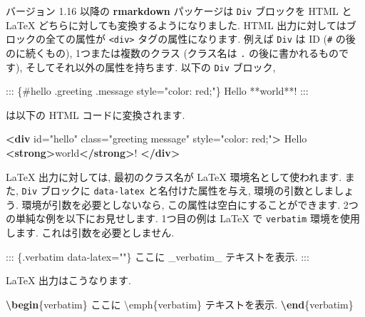 \documentclass[
  11pt,
  lualatex,
  ja=standard]{bxjsreport}
\newenvironment{Shaded}{\begin{snugshade}}{\end{snugshade}}
\newcommand{\ExtensionTok}[1]{#1}
\newcommand{\KeywordTok}[1]{\textcolor[rgb]{0.13,0.29,0.53}{\textbf{#1}}}
\newcommand{\NormalTok}[1]{#1}
\newcommand{\OtherTok}[1]{\textcolor[rgb]{0.56,0.35,0.01}{#1}}
\newcommand{\StringTok}[1]{\textcolor[rgb]{0.31,0.60,0.02}{#1}}
\newcommand{\VerbatimStringTok}[1]{\textcolor[rgb]{0.31,0.60,0.02}{#1}}
\begin{document}
バージョン 1.16 以降の \textbf{rmarkdown} パッケージは \texttt{Div} ブロックを HTML と LaTeX どちらに対しても変換するようになりました. HTML 出力に対してはブロックの全ての属性が \texttt{\textless{}div\textgreater{}} タグの属性になります. 例えば \texttt{Div} は ID (\texttt{\#} の後のに続くもの), 1つまたは複数のクラス (クラス名は \texttt{.} の後に書かれるものです), そしてそれ以外の属性を持ちます. 以下の \texttt{Div} ブロック,

\begin{Shaded}
\begin{Highlighting}[]
\NormalTok{::: \{\#hello .greeting .message style="color: red;"\}}
\NormalTok{Hello **world**!}
\NormalTok{:::}
\end{Highlighting}
\end{Shaded}

は以下の HTML コードに変換されます.

\begin{Shaded}
\begin{Highlighting}[]
\KeywordTok{\textless{}div}\OtherTok{ id=}\StringTok{"hello"}\OtherTok{ class=}\StringTok{"greeting message"}\OtherTok{ style=}\StringTok{"color: red;"}\KeywordTok{\textgreater{}}
\NormalTok{  Hello }\KeywordTok{\textless{}strong\textgreater{}}\NormalTok{world}\KeywordTok{\textless{}/strong\textgreater{}}\NormalTok{!}
\KeywordTok{\textless{}/div\textgreater{}}
\end{Highlighting}
\end{Shaded}

LaTeX 出力に対しては, 最初のクラス名が LaTeX 環境名として使われます. また, \texttt{Div} ブロックに \texttt{data-latex} と名付けた属性を与え, 環境の引数としましょう. 環境が引数を必要としないなら, この属性は空白にすることができます. 2つの単純な例を以下にお見せします. 1つ目の例は LaTeX で \texttt{verbatim} 環境を使用します. これは引数を必要としません.

\begin{Shaded}
\begin{Highlighting}[]
\NormalTok{::: \{.verbatim data{-}latex=""\}}
\NormalTok{ここに \_verbatim\_ テキストを表示.}
\NormalTok{:::}
\end{Highlighting}
\end{Shaded}

LaTeX 出力はこうなります.

\begin{Shaded}
\begin{Highlighting}[]
\KeywordTok{\textbackslash{}begin}\NormalTok{\{}\ExtensionTok{verbatim}\NormalTok{\}}
\VerbatimStringTok{ここに \textbackslash{}emph\{verbatim\} テキストを表示.}
\KeywordTok{\textbackslash{}end}\NormalTok{\{}\ExtensionTok{verbatim}\NormalTok{\}}
\end{Highlighting}
\end{Shaded}
\end{document}
